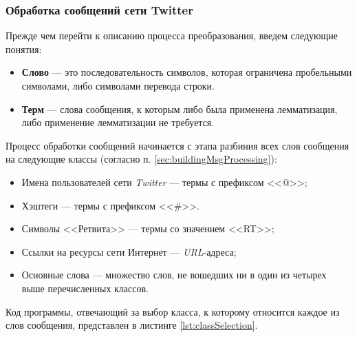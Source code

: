     \lstset{style=python}
    

    \subsubsection{Обработка сообщений сети Twitter}
    Прежде чем перейти к описанию процесса преобразования, введем следующие
    понятия:
    \begin{itemize}
        \item {\bf Слово} --- это последовательность символов, которая ограничена
            пробельными символами, либо символами перевода строки.
        \item {\bf Терм} --- слова сообщения, к которым либо была применена
            лемматизация, либо применение лемматизации не требуется.
    \end{itemize}


    Процесс обработки сообщений начинается с этапа разбиния всех слов сообщения
    на следующие классы (согласно п. \ref{sec:buildingMsgProcessing}):
    \begin{itemize}
        \item Имена пользователей сети {\it Twitter} --- термы с префиксом <<@>>;
        \item Хэштеги --- термы с префиксом <<\#>>.
        \item Символы <<Ретвита>> --- термы со значением <<RT>>;
        \item Ссылки на ресурсы сети Интернет --- {\it URL\hspace{1pt}}-адреса;
        \item Основные слова --- множество слов, не вошедших ни в один из четырех
            выше перечисленных классов.
    \end{itemize}

    Код программы, отвечающий за выбор класса, к которому относится каждое из
    слов сообщения, представлен в листинге \ref{lst:classSelection}.

